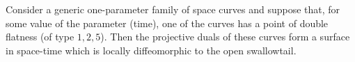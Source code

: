 Consider a generic one-parameter family of space curves and suppose that, for some value of the parameter (time), one of the curves has a point of double flatness (of type $1, 2, 5$). Then the projective duals of these curves form a surface in space-time which is locally diffeomorphic to the open swallowtail.
